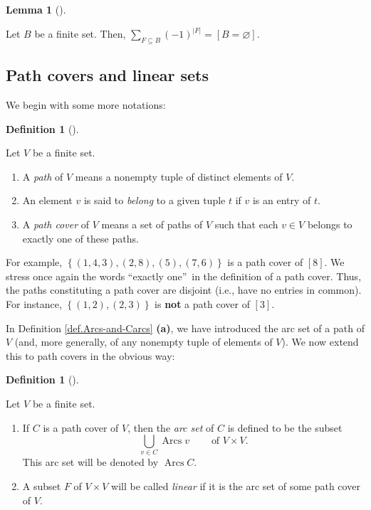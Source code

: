 \documentclass[numbers=enddot,12pt,final,onecolumn,notitlepage]{scrartcl}%
\numberwithin{exer}{section}
\theoremstyle{definition}
\newtheorem{lem}[theo]{Lemma}
\newenvironment{lemma}[1][]
{\begin{lem}[#1]\begin{leftbar}}
{\end{leftbar}\end{lem}}
\newtheorem{defi}[theo]{Definition}
\newenvironment{definition}[1][]
{\begin{defi}[#1]\begin{leftbar}}
{\end{leftbar}\end{defi}}
\let\sumnonlimits\sum
\let\cupnonlimits\bigcup
\renewcommand{\sum}{\sumnonlimits\limits}
\renewcommand{\bigcup}{\cupnonlimits\limits}
\begin{document}
\begin{lemma}
\label{lem.cancel}Let $B$ be a finite set. Then, $\sum_{F\subseteq B}\left(
-1\right)  ^{\left\vert F\right\vert }=\left[  B=\varnothing\right]  $.
\end{lemma}

\subsection{Path covers and linear sets}

We begin with some more notations:

\begin{definition}
Let $V$ be a finite set.

\begin{enumerate}
\item[\textbf{(a)}] A \emph{path} of $V$ means a nonempty tuple of distinct
elements of $V$.

\item[\textbf{(b)}] An element $v$ is said to \emph{belong} to a given tuple
$t$ if $v$ is an entry of $t$.

\item[\textbf{(c)}] A \emph{path cover} of $V$ means a set of paths of $V$
such that each $v\in V$ belongs to exactly one of these paths.
\end{enumerate}
\end{definition}

For example, $\left\{  \left(  1,4,3\right)  ,\left(  2,8\right)  ,\left(
5\right)  ,\left(  7,6\right)  \right\}  $ is a path cover of $\left[
8\right]  $. We stress once again the words \textquotedblleft exactly
one\textquotedblright\ in the definition of a path cover. Thus, the paths
constituting a path cover are disjoint (i.e., have no entries in common). For
instance, $\left\{  \left(  1,2\right)  ,\left(  2,3\right)  \right\}  $ is
\textbf{not} a path cover of $\left[  3\right]  $.

In Definition \ref{def.Arcs-and-Carcs} \textbf{(a)}, we have introduced the
arc set of a path of $V$ (and, more generally, of any nonempty tuple of
elements of $V$). We now extend this to path covers in the obvious way:

\begin{definition}
Let $V$ be a finite set.

\begin{enumerate}
\item[\textbf{(a)}] If $C$ is a path cover of $V$, then the \emph{arc set} of
$C$ is defined to be the subset%
\[
\bigcup_{v\in C}\operatorname*{Arcs}v\ \ \ \ \ \ \ \ \ \ \text{of }V\times V.
\]
This arc set will be denoted by $\operatorname*{Arcs}C$.

\item[\textbf{(b)}] A subset $F$ of $V\times V$ will be called \emph{linear}
if it is the arc set of some path cover of $V$.
\end{enumerate}
\end{definition}
\end{document}
